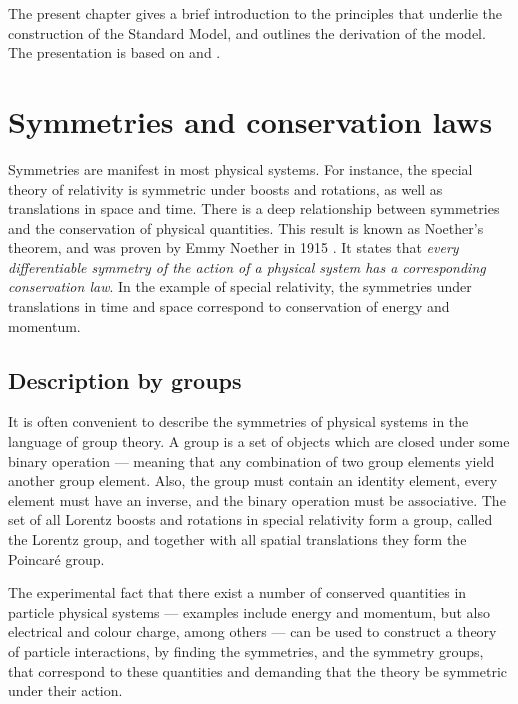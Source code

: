 \documentclass[twoside,english]{uiofysmaster}
\begin{document}
The present chapter gives a brief introduction to the principles that underlie the construction of the Standard Model, and outlines the derivation of the model. The presentation is based on \cite{Mandl-Shaw} and \cite{Peskin-Schroeder}.

\section{Symmetries and conservation laws}
Symmetries are manifest in most physical systems. For instance, the special theory of relativity is symmetric under boosts and rotations, as well as translations in space and time. There is a deep relationship between symmetries and the conservation of physical quantities. This result is known as Noether's theorem, and was proven by Emmy Noether in 1915 \cite{Noether:1918zz}. It states that {\it every differentiable symmetry of the action of a physical system has a corresponding conservation law}. In the example of special relativity, the symmetries under translations in time and space correspond to conservation of energy and momentum.%

\subsection{Description by groups}
It is often convenient to describe the symmetries of physical systems in the language of group theory. A group is a set of objects which are closed under some binary operation --- meaning that any combination of two group elements yield another group element. Also, the group must contain an identity element, every element must have an inverse, and the binary operation must be associative. The set of all Lorentz boosts and rotations in special relativity form a group, called the Lorentz group, and together with all spatial translations they form the Poincar\'{e} group. 

The experimental fact that there exist a number of conserved quantities in particle physical systems --- examples include energy and momentum, but also electrical and colour charge, among others --- can be used to construct a theory of particle interactions, by finding the symmetries, and the symmetry groups, that correspond to these quantities and demanding that the theory be symmetric under their action.
\end{document}
